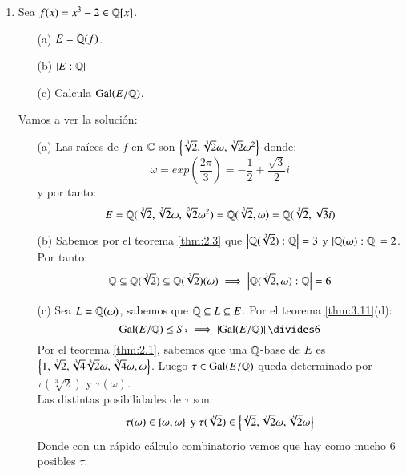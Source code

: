 \begin{eg}
\begin{enumerate}
        \item Sea $f(x) = x^3 - 2 \in \mathbb{Q}[x]$.
        \begin{itemize}
            \item[(a)] $E = \mathbb{Q}(f)$.
            \item[(b)] $\left|E: \mathbb{Q}\right|$
            \item[(c)] Calcula $\mathrm{Gal}(E/\mathbb{Q})$.
        \end{itemize}

        Vamos a ver la solución:
        \begin{itemize}
            \item[(a)] Las raíces de $f$ en $\mathbb{C}$ son $\left\{\sqrt[3]{2}, \sqrt[3]{2} \omega, \sqrt[3]{2} \omega^2\right\}$ donde:
            $$
                \omega = exp\left( \frac{2\pi}{3} \right) = -\frac{1}{2} + \frac{\sqrt 3}{2} i
            $$
            y por tanto:
            $$
                E = \mathbb{Q}(\sqrt[3]{2}, \sqrt[3]{2} \omega, \sqrt[3]{2} \omega^2) = \mathbb{Q}(\sqrt[3]{2}, \omega) = \mathbb{Q}(\sqrt[3]{2}, \sqrt{3} i)
            $$
            \item[(b)] Sabemos por el teorema \ref{thm:2.3} que $\left|\mathbb{Q}(\sqrt[3]{2}):\mathbb{Q}\right| = 3$ y $\left|\mathbb{Q}(\omega):\mathbb{Q}\right| = 2$. Por tanto:
            $$
                \mathbb{Q} \subseteq \mathbb{Q}(\sqrt[3]{2}) \subseteq \mathbb{Q}(\sqrt[3]{2})(\omega) \implies \left|\mathbb{Q}(\sqrt[3]{2}, \omega):\mathbb{Q}\right| = 6
            $$
            \item[(c)] Sea $L = \mathbb{Q}(\omega)$, sabemos que $\mathbb{Q} \subseteq L \subseteq E$. Por el teorema \ref{thm:3.11}(d):
            $$
                \gal(E/\Q) \leq S_3 \implies \vabs{\gal(E/\Q)} \divides 6
            $$
            Por el teorema \ref{thm:2.1}, sabemos que una $\mathbb{Q}$-base de $E$ es $\left\{1, \sqrt[3]{2}, \sqrt[3]{4} \sqrt[3]{2} \omega, \sqrt[3]{4} \omega,  \omega\right\}$. Luego $\tau \in \mathrm{Gal}(E/\mathbb{Q})$ queda determinado por $\tau(\sqrt[3]{2})$ y $\tau(\omega)$.\\
            Las distintas posibilidades de $\tau$ son:
            $$
                \tau(\omega) \in \left\{\omega, \bar \omega\right\} \text{ y } \tau(\sqrt[3]{2}) \in \left\{\sqrt[3]{2}, \sqrt[3]{2} \omega, \sqrt[3]{2} \bar \omega\right\}
            $$
            Donde con un rápido cálculo combinatorio vemos que hay como mucho $6$ posibles $\tau$.
        \end{itemize}
    \end{enumerate}
\end{eg}

